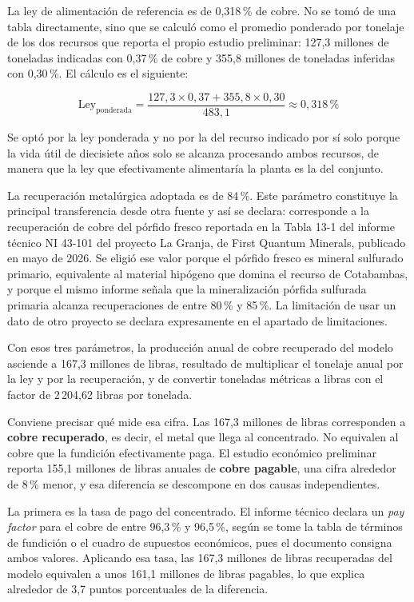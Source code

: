 La ley de alimentación de referencia es de 0,318\,\% de cobre. No se tomó de una
tabla directamente, sino que se calculó como el promedio ponderado por tonelaje de
los dos recursos que reporta el propio estudio preliminar: 127,3 millones de
toneladas indicadas con 0,37\,\% de cobre y 355,8 millones de toneladas inferidas
con 0,30\,\%. El cálculo es el siguiente:

\begin{equation}
\text{Ley}_{\text{ponderada}} =
\frac{127{,}3 \times 0{,}37 + 355{,}8 \times 0{,}30}{483{,}1} \approx 0{,}318\,\%
\end{equation}

Se optó por la ley ponderada y no por la del recurso indicado por sí solo porque
la vida útil de diecisiete años solo se alcanza procesando ambos recursos, de
manera que la ley que efectivamente alimentaría la planta es la del conjunto.

La recuperación metalúrgica adoptada es de 84\,\%. Este parámetro constituye la
principal transferencia desde otra fuente y así se declara: corresponde a la
recuperación de cobre del pórfido fresco reportada en la Tabla 13-1 del informe
técnico NI 43-101 del proyecto La Granja, de First Quantum Minerals, publicado en
mayo de 2026. Se eligió ese valor porque el pórfido fresco es mineral sulfurado
primario, equivalente al material hipógeno que domina el recurso de Cotabambas, y
porque el mismo informe señala que la mineralización pórfida sulfurada primaria
alcanza recuperaciones de entre 80\,\% y 85\,\%. La limitación de usar un dato de
otro proyecto se declara expresamente en el apartado de limitaciones.

Con esos tres parámetros, la producción anual de cobre recuperado del modelo
asciende a 167,3 millones de libras, resultado de multiplicar el tonelaje anual
por la ley y por la recuperación, y de convertir toneladas métricas a libras con
el factor de 2\,204,62 libras por tonelada.

Conviene precisar qué mide esa cifra. Las 167,3 millones de libras corresponden a
\textbf{cobre recuperado}, es decir, el metal que llega al concentrado. No equivalen al
cobre que la fundición efectivamente paga. El estudio económico preliminar reporta
155,1 millones de libras anuales de \textbf{cobre pagable}, una cifra alrededor de
8\,\% menor, y esa diferencia se descompone en dos causas independientes.

La primera es la tasa de pago del concentrado. El informe técnico declara un
\emph{pay factor} para el cobre de entre 96,3\,\% y 96,5\,\%, según se tome la tabla de
términos de fundición o el cuadro de supuestos económicos, pues el documento consigna
ambos valores. Aplicando esa tasa, las 167,3 millones de libras recuperadas del modelo
equivalen a unos 161,1 millones de libras pagables, lo que explica alrededor de
3,7 puntos porcentuales de la diferencia.

